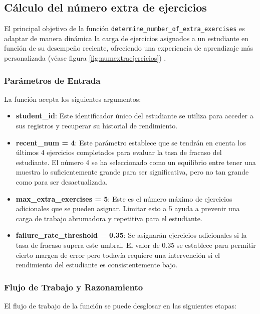 \subsection{Cálculo del número extra de ejercicios}

El principal objetivo de la función \texttt{determine\_number\_of\_extra\_exercises} es adaptar de manera dinámica la carga de ejercicios asignados a un estudiante en función de su desempeño reciente, ofreciendo una experiencia de aprendizaje más personalizada (véase figura \ref{fig:numextraejercicios}) .

\subsubsection{Parámetros de Entrada}

La función acepta los siguientes argumentos:

\begin{itemize}
    \item \textbf{student\_id}: Este identificador único del estudiante se utiliza para acceder a sus registros y recuperar su historial de rendimiento.
    \item \textbf{recent\_num = 4}: Este parámetro establece que se tendrán en cuenta los últimos 4 ejercicios completados para evaluar la tasa de fracaso del estudiante. El número 4 se ha seleccionado como un equilibrio entre tener una muestra lo suficientemente grande para ser significativa, pero no tan grande como para ser desactualizada.
    \item \textbf{max\_extra\_exercises = 5}: Este es el número máximo de ejercicios adicionales que se pueden asignar. Limitar esto a 5 ayuda a prevenir una carga de trabajo abrumadora y repetitiva para el estudiante.
    \item \textbf{failure\_rate\_threshold = 0.35}: Se asignarán ejercicios adicionales si la tasa de fracaso supera este umbral. El valor de 0.35 se establece para permitir cierto margen de error pero todavía requiere una intervención si el rendimiento del estudiante es consistentemente bajo.
\end{itemize}

\subsubsection{Flujo de Trabajo y Razonamiento}

El flujo de trabajo de la función se puede desglosar en las siguientes etapas:

